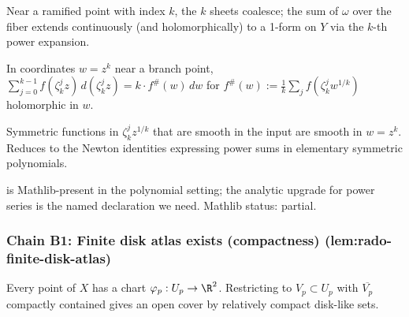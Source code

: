 \begin{lemma}
\label{lem:trf-r2}
Near a ramified point with index $k$, the $k$ sheets coalesce; the sum of $\omega$ over the fiber extends continuously (and holomorphically) to a 1-form on $Y$ via the $k$-th power expansion.
\leanok
\end{lemma}

\begin{lemma}
\label{lem:trf-r3}
In coordinates $w = z^{k}$ near a branch point, $\sum_{j=0}^{k-1} f(\zeta_{k}^{j} z)\,d(\zeta_{k}^{j} z) = k \cdot f^{\#}(w)\,dw$ for $f^{\#}(w) := \frac{1}{k}\sum_{j} f(\zeta_{k}^{j} w^{1/k})$ holomorphic in $w$.
\leanok
\end{lemma}

\begin{lemma}
\label{lem:trf-r4}
Symmetric functions in $\zeta_{k}^{j} z^{1/k}$ that are smooth in the input are smooth in $w = z^{k}$.  Reduces to the Newton identities expressing power sums in elementary symmetric polynomials.
\leanok
\end{lemma}

\begin{lemma}
\label{lem:trf-r5}
 is Mathlib-present in the polynomial setting; the analytic upgrade for power series is the named declaration we need.  Mathlib status: partial.
\leanok
\end{lemma}

\subsubsection*{Chain B1: Finite disk atlas exists (compactness) (lem:rado-finite-disk-atlas)}

\begin{lemma}
\label{lem:rfd-r1}
Every point of $X$ has a chart $\varphi_{p} : U_{p} \to \R^{2}$.  Restricting to $V_{p} \subset U_{p}$ with $\overline{V_{p}}$ compactly contained gives an open cover by relatively compact disk-like sets.
\leanok\mathlibok
\end{lemma}

